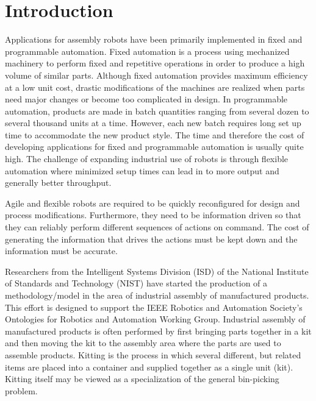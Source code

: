 \documentclass[final,12pt]{elsarticle}
\begin{document}
\section{Introduction}
\label{sect:introduction}

Applications for assembly robots have been primarily implemented in fixed and programmable automation. Fixed automation is a process using mechanized machinery to perform fixed and repetitive operations in order to produce a high volume of similar parts. Although fixed automation provides maximum efficiency at a low unit cost, drastic modifications of the machines are realized when parts need major changes or become too complicated in design. In programmable automation, products are made in batch quantities ranging from several dozen to several thousand units at a time. However, each new batch requires long set up time to accommodate the new product style. The time and therefore the cost of developing applications for fixed and programmable automation is usually quite high. The challenge of expanding industrial use of robots is through flexible automation where minimized setup times can lead in to more output and generally better throughput.

Agile and flexible robots are required to be quickly reconfigured for design and process modifications. Furthermore, they need to be information driven so that they can reliably perform different sequences of actions on command. The cost of generating the information that drives the actions must be kept down and the information must be accurate.

Researchers from the Intelligent Systems Division (ISD) of the National Institute of Standards and Technology (NIST) have started the production of a methodology/model in the area of industrial assembly of manufactured products. This effort is designed to support the IEEE Robotics and Automation Society's Ontologies for Robotics and Automation Working Group. Industrial assembly of manufactured products is often performed by first bringing parts together in a kit and then moving the kit to the assembly area where the parts are used to assemble products. Kitting is the process in which several different, but related items are placed into a container and supplied together as a single unit (kit). Kitting itself may be viewed as a specialization of the general bin-picking problem.
\end{document}
